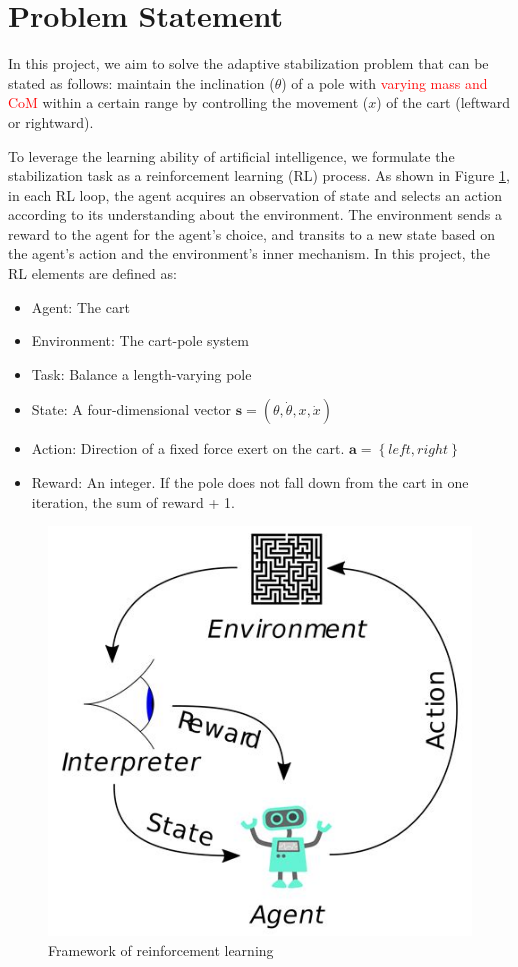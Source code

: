 \documentclass[10pt,a4paper]{article}
\begin{document}
	\section{Problem Statement}
	In this project, we aim to solve the adaptive stabilization problem that can be stated as follows: maintain the inclination ($\theta$) of a pole with \textcolor{red}{varying mass and CoM} within a certain range by controlling the movement ($x$) of the cart (leftward or rightward).
	
	To leverage the learning ability of artificial intelligence, we formulate the stabilization task as a reinforcement learning (RL) process. As shown in Figure \ref{fig:rl}, in each RL loop, the agent acquires an observation of state and selects an action according to its understanding about the environment. The environment sends a reward to  the agent for the agent's choice, and transits to a new state based on the agent's action and the environment's inner mechanism. In this project, the RL elements are defined as:
	
	\begin{itemize}
		\item Agent: The cart
		\item Environment: The cart-pole system
		\item Task: Balance a length-varying pole
		\item State: A four-dimensional vector $\boldsymbol{s} = (\theta, \dot{\theta}, x, \dot{x})$
		\item Action: Direction of a fixed force exert on the cart. $\boldsymbol{a} = \left\{ left, right\right\}$
		\item Reward: An integer. If the pole does not fall down from the cart in one iteration, the sum of reward + 1. 
	\end{itemize}
	
	
	
	
	\begin{figure}
		\centering
		\includegraphics[width=0.3\linewidth]{figure/rl}
		\caption{Framework of reinforcement learning}
		\label{fig:rl}
	\end{figure}
	
\end{document}
